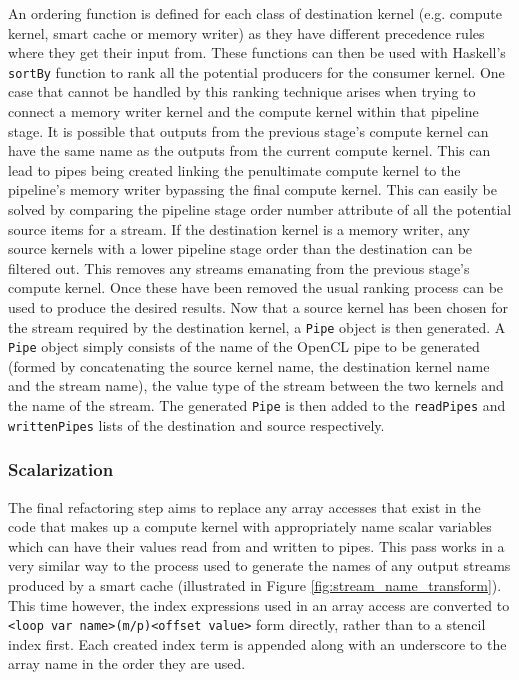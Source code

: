 \documentclass{mpaper}
\begin{document}
An ordering function is defined for each class of destination kernel (e.g. compute kernel, smart cache or memory writer) as they have different precedence rules where they get their input from. 
These functions can then be used with Haskell's \texttt{sortBy} function to rank all the potential producers for the consumer kernel.
One case that cannot be handled by this ranking technique arises when trying to connect a memory writer kernel and the compute kernel within that pipeline stage.
It is possible that outputs from the previous stage's compute kernel can have the same name as the outputs from the current compute kernel. 
This can lead to pipes being created linking the penultimate compute kernel to the pipeline's memory writer bypassing the final compute kernel.
This can easily be solved by comparing the pipeline stage order number attribute of all the potential source items for a stream.
If the destination kernel is a memory writer, any source kernels with a lower pipeline stage order than the destination can be filtered out. 
This removes any streams emanating from the previous stage's compute kernel.
Once these have been removed the usual ranking process can be used to produce the desired results.
Now that a source kernel has been chosen for the stream required by the destination kernel, a \texttt{Pipe} object is then generated. 
A \texttt{Pipe} object simply consists of the name of the OpenCL pipe to be generated (formed by concatenating the source kernel name, the destination kernel name and the stream name), the value type of the stream between the two kernels and the name of the stream. 
The generated \texttt{Pipe} is then added to the \texttt{readPipes} and \texttt{writtenPipes} lists of the destination and source respectively.

\subsubsection*{Scalarization}
\label{scalarization}

The final refactoring step aims to replace any array accesses that exist in the code that makes up a compute kernel with appropriately name scalar variables which can have their values read from and written to pipes. 
This pass works in a very similar way to the process used to generate the names of any output streams produced by a smart cache (illustrated in Figure \ref{fig:stream_name_transform}).
This time however, the index expressions used in an array access are converted to \texttt{<loop var name>(m/p)<offset value>} form directly, rather than to a stencil index first.
Each created index term is appended along with an underscore to the array name in the order they are used.
\end{document}

